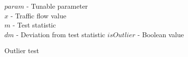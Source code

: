 \documentclass[conference]{IEEEtran}
\begin{document}

 
%		


\begin{algorithm}
	\begin{algorithmic}[1]
		\renewcommand{\algorithmicrequire}{\textbf{Input:}}
		\renewcommand{\algorithmicensure}{\textbf{Output:}}
		\REQUIRE
		$param$ - Tunable parameter \\
		$x$ - Traffic flow value \\
		$m$ - Test statistic \\
		$dm$ - Deviation from test statistic
		\ENSURE
		$isOutlier$ - Boolean value
		
	\end{algorithmic}
	\caption{Outlier test}
	\label{outlier_test}
\end{algorithm}
\end{document}
